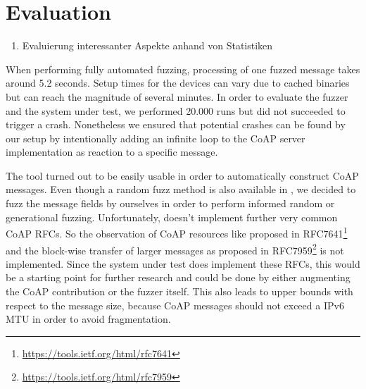 \section{Evaluation}

\begin{enumerate}
	\item Evaluierung interessanter Aspekte anhand von Statistiken
\end{enumerate}

When performing fully automated fuzzing, processing of one fuzzed message takes around 5.2 seconds. Setup times for the devices can vary due to cached binaries but can reach the magnitude of several minutes. In order to evaluate the fuzzer and the system under test, we performed 20.000 runs but did not succeeded to trigger a crash. Nonetheless we ensured that potential crashes can be found by our setup by intentionally adding an infinite loop to the CoAP server implementation as reaction to a specific message.  

The \scapy tool turned out to be easily usable in order to automatically construct CoAP messages. Even though a random fuzz method is also available in \scapy, we decided to fuzz the message fields by ourselves in order to perform informed random or generational fuzzing. Unfortunately, \scapy doesn't implement further very common CoAP RFCs. So the observation of CoAP resources like proposed in RFC7641\footnote{\url{https://tools.ietf.org/html/rfc7641}} and the block-wise transfer of larger messages as proposed in RFC7959\footnote{\url{https://tools.ietf.org/html/rfc7959}} is not implemented. Since the system under test does implement these RFCs, this would be a starting point for further research and could be done by either augmenting the \scapy CoAP contribution or the fuzzer itself. This also leads to upper bounds with respect to the message size, because CoAP messages should not exceed a IPv6 MTU in order to avoid fragmentation. 

